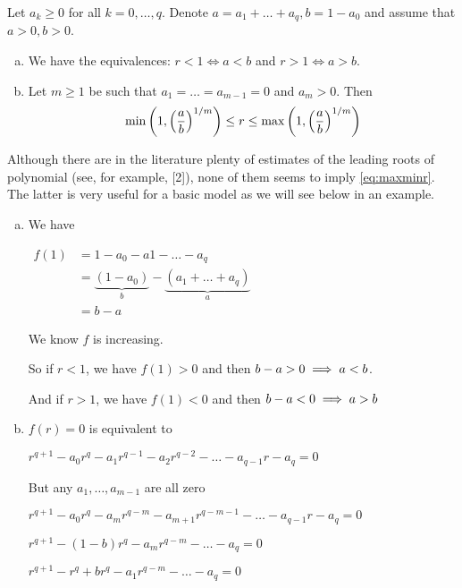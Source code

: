 \begin{theorem}
Let $a_k \geq 0$ for all $k = 0, \dots , q$. Denote $a = a_1 + \dots + a_q, b = 1 - a_0$
and assume that $a > 0, b > 0$.
\begin{enumerate}[(a)]
    \item We have the equivalences: $r < 1 \iff a < b$ and $r > 1 \iff a > b$.
    \item Let $m \geq 1$ be such that $a_1 = \dots = a_{m-1} = 0$ and $a_m > 0$. Then
    \begin{equation} \label{eq:maxminr}
        \min\left(1,\left(\frac{a}{b}\right)^{1/m}\right)\leq r \leq \max\left(1,\left(\frac{a}{b}\right)^{1/m}\right)
    \end{equation}
\end{enumerate}
\begin{remark}
Although there are in the literature plenty of estimates of the leading roots of polynomial (see, for example, [2]), none of them seems to imply \ref{eq:maxminr}. The latter is very useful for a basic model as we will see below in an example.
\end{remark}
\begin{pf}
\begin{enumerate}[(a)]
    \item We have 
    
    $\begin{aligned}
    f(1) &= 1 - a_0 - a1 - \dots - a_q \\
         &= \underbrace{(1-a_0)}_{b}-\underbrace{(a_1+\dots+a_q)}_{a}\\
         &= b - a
    \end{aligned}$
    
    We know $f$ is increasing.
    
    So if $r<1$, we have $f(1)>0$ and then $b - a>0 \implies a<b$.
    
    And if $r>1$, we have $f(1)<0$ and then $b - a<0 \implies a>b$
    
    \item $f(r)=0$ is equivalent to 
    
    $r^{q+1} - a_0r^q - a_1r^{q-1} - a_2r^{q-2} - \dots - a_{q-1}r - a_q=0$
    
    But any $a_1,\dots,a_{m-1}$ are all zero
    
    \imp $r^{q+1} - a_0r^q - a_mr^{q-m} - a_{m+1}r^{q-m-1} - \dots - a_{q-1}r - a_q=0$ 
     
    \imp $r^{q+1} - (1-b)r^q - a_mr^{q-m} - \dots -  a_q=0$
    
    \imp $r^{q+1} - r^q + br^q - a_1r^{q-m} - \dots -  a_q=0$
    

\end{enumerate}
\end{pf}
\end{theorem}
